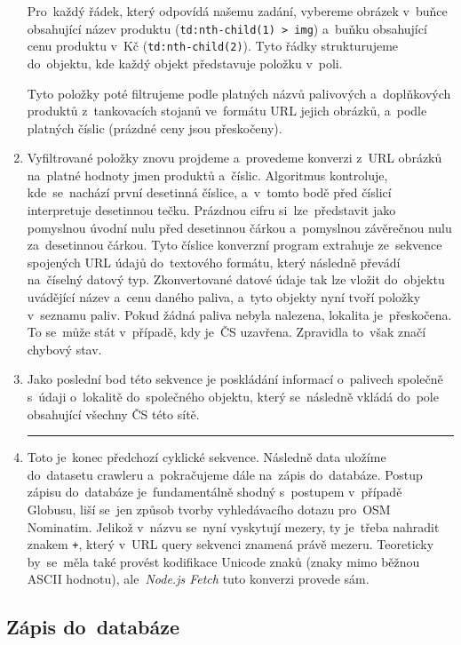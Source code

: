 \begin{enumerate}
        Pro~každý řádek, který odpovídá našemu zadání, vybereme obrázek
        v~buňce obsahující název produktu (\texttt{td:nth-child(1) > img})
        a~buňku obsahující cenu produktu v~Kč (\texttt{td:nth-child(2)}).
        Tyto řádky strukturujeme do~objektu, kde každý objekt představuje
        položku v~poli.

        Tyto položky poté filtrujeme podle platných názvů palivových
        a~doplňkových produktů z~tankovacích stojanů ve~formátu URL jejich
        obrázků, a~podle platných číslic (prázdné ceny jsou přeskočeny).
    \item Vyfiltrované položky znovu projdeme a~provedeme konverzi
        z~URL obrázků na~platné hodnoty jmen produktů a~číslic. Algoritmus
        kontroluje, kde~se~nachází první desetinná číslice, a~v~tomto bodě
        před číslicí interpretuje desetinnou tečku. Prázdnou cifru
        si~lze~představit jako pomyslnou úvodní nulu před desetinnou čárkou
        a~pomyslnou závěrečnou nulu za~desetinnou čárkou. Tyto číslice
        konverzní program extrahuje ze~sekvence spojených URL údajů
        do~textového formátu, který následně převádí na~číselný datový typ.
        Zkonvertované datové údaje tak lze vložit do~objektu uvádějící název
        a~cenu daného paliva, a~tyto objekty nyní tvoří položky v~seznamu
        paliv. Pokud žádná paliva nebyla nalezena, lokalita je~přeskočena.
        To se~může stát v~případě, kdy je~ČS uzavřena. Zpravidla to~však
        značí chybový stav.
    \item Jako poslední bod této sekvence je poskládání informací o~palivech
        společně s~údaji o~lokalitě do~společného objektu, který se~následně
        vkládá do~pole obsahující všechny ČS této sítě.
        \hrule
    \item Toto je~konec předchozí cyklické sekvence. Následně data uložíme
        do~datasetu crawleru a~pokračujeme dále na~zápis do~databáze.
        Postup zápisu do~databáze je~fundamentálně shodný s~postupem
        v~případě Globusu, liší se~jen způsob tvorby vyhledávacího dotazu
        pro~OSM Nominatim. Jelikož v~názvu se~nyní vyskytují mezery,
        ty je~třeba nahradit znakem \texttt{+}, který v~URL query sekvenci
        znamená právě mezeru. Teoreticky by~se~měla také provést kodifikace
        Unicode znaků (znaky mimo běžnou ASCII hodnotu), ale~\emph{Node.js
        Fetch} tuto konverzi provede sám.
\end{enumerate}

\subsection{Zápis do~databáze}
\label{sec:writing-to-db}

